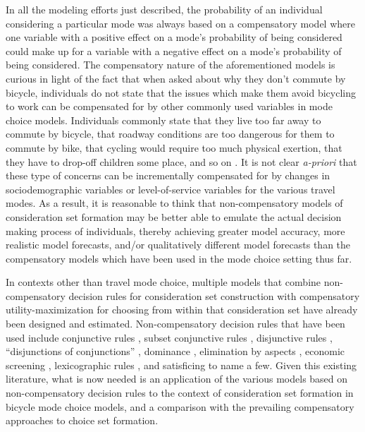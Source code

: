 \documentclass{article}
\begin{document}
In all the modeling efforts just described, the probability of an individual considering a particular mode was always based on a compensatory model where one variable with a positive effect on a mode's probability of being considered could make up for a variable with a negative effect on a mode's probability of being considered. The compensatory nature of the aforementioned models is curious in light of the fact that when asked about why they don't commute by bicycle, individuals do not state that the issues which make them avoid bicycling to work can be compensated for by other commonly used variables in mode choice models. Individuals commonly state that they live too far away to commute by bicycle, that roadway conditions are too dangerous for them to commute by bike, that cycling would require too much physical exertion, that they have to drop-off children some place, and so on \citep{goldsmith_reasons_1992, cleland_why_2004}. It is not clear  \textit{a-priori} that these type of concerns can be incrementally compensated for by changes in sociodemographic variables or level-of-service variables for the various travel modes. As a result, it is reasonable to think that non-compensatory models of consideration set formation may be better able to emulate the actual decision making process of individuals, thereby achieving greater model accuracy, more realistic model forecasts, and/or qualitatively different model forecasts than the compensatory models which have been used in the mode choice setting thus far.

In contexts other than travel mode choice, multiple models that combine non-compensatory decision rules for consideration set construction with compensatory utility-maximization for choosing from within that consideration set have already been designed and estimated. Non-compensatory decision rules that have been used include conjunctive rules \citep{swait_non-compensatory_2001, elrod_new_2004, gilbride_choice_2004}, subset conjunctive rules \citep{jedidi_probabilistic_2005}, disjunctive rules \citep{swait_non-compensatory_2001, elrod_new_2004, gilbride_choice_2004}, ``disjunctions of conjunctions'' \citep{hauser_disjunctions_2010}, dominance \citep{cascetta_dominance_2009}, elimination by aspects \citep{gilbride_estimating_2006}, economic screening \citep{gilbride_estimating_2006}, lexicographic rules \citep{kohli_representation_2007}, and satisficing  \citep{stuttgen_satisficing_2012} to name a few. Given this existing literature, what is now needed is an application of the various models based on non-compensatory decision rules to the context of consideration set formation in bicycle mode choice models, and a comparison with the prevailing compensatory approaches to choice set formation.
\end{document}
